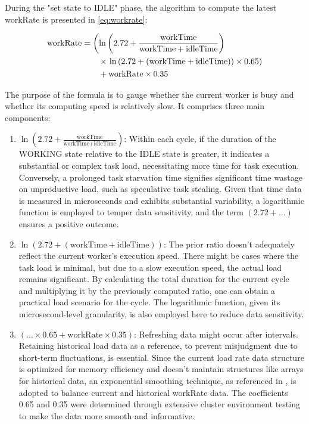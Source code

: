 \documentclass{mproj}
\begin{document}
During the "set state to IDLE" phase, the algorithm to compute the latest workRate is presented in \ref{eq:workrate}:

\begin{align}
    \text{workRate} & = \left( \ln\left( 2.72 + \frac{\text{workTime}}{\text{workTime} + \text{idleTime}} \right) \right. \notag   \\
                    & \qquad \times \left. \ln\left( 2.72 + (\text{workTime} + \text{idleTime}) \right) \times 0.65 \right) \notag \\
                    & \qquad + \text{workRate} \times 0.35 \label{eq:workrate}
\end{align}

The purpose of the formula is to gauge whether the current worker is busy and whether its computing speed is relatively slow. It comprises three main components:
\begin{enumerate}
    \item $\ln\left( 2.72 + \frac{\text{workTime}}{\text{workTime} + \text{idleTime}} \right)$:
          Within each cycle, if the duration of the WORKING state relative to the IDLE state is greater,
          it indicates a substantial or complex task load, necessitating more time for task execution.
          Conversely, a prolonged task starvation time signifies significant time wastage on unproductive load,
          such as speculative task stealing.
          Given that time data is measured in microseconds and exhibits substantial variability,
          a logarithmic function is employed to temper data sensitivity,
          and the term $(2.72+...)$ ensures a positive outcome.

    \item $\ln\left( 2.72 + (\text{workTime} + \text{idleTime}) \right)$:
          The prior ratio doesn't adequately reflect the current worker's execution speed.
          There might be cases where the task load is minimal,
          but due to a slow execution speed, the actual load remains significant.
          By calculating the total duration for the current cycle and multiplying it by the previously computed ratio,
          one can obtain a practical load scenario for the cycle.
          The logarithmic function, given its microsecond-level granularity, is also employed here to reduce data sensitivity.

    \item $(... \times 0.65 +\text{workRate} \times 0.35)$:
          Refreshing data might occur after intervals.
          Retaining historical load data as a reference, to prevent misjudgment due to short-term fluctuations, is essential.
          Since the current load rate data structure is optimized for memory efficiency and doesn't maintain structures like arrays for historical data,
          an exponential smoothing technique, as referenced in \cite{GARDNER2006637},
          is adopted to balance current and historical workRate data.
          The coefficients 0.65 and 0.35 were determined through extensive cluster environment testing
          to make the data more smooth and informative.
\end{enumerate}
\end{document}
